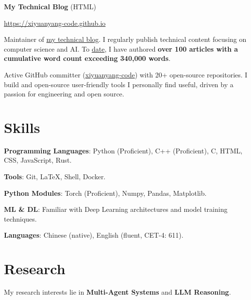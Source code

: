\documentclass[letterpaper,11pt]{article}
\begin{document}
\textbf{My Technical Blog} (HTML)

\url{https://xiyuanyang-code.github.io} 

Maintainer of \href{https://xiyuanyang-code.github.io}{my technical blog}. I regularly publish technical content focusing on computer science and AI. To \href{https://xiyuanyang-code.github.io/Blog-word-counting/}{date}, I have authored \textbf{over 100 articles with a cumulative word count exceeding 340,000 words}.
\newline

Active GitHub committer (\href{https://github.com/xiyuanyang-code}{xiyuanyang-code}) with 20+ open-source repositories. I build and open-source user-friendly tools I personally find useful, driven by a passion for engineering and open source.

\section{Skills}
\textbf{Programming Languages}: Python (Proficient), C++ (Proficient), C, HTML, CSS, JavaScript, Rust.

\textbf{Tools}: Git, LaTeX, Shell, Docker.

\textbf{Python Modules}: Torch (Proficient), Numpy, Pandas, Matplotlib.

\textbf{ML \& DL}: Familiar with Deep Learning architectures and model training techniques.

\textbf{Languages}: Chinese (native), English (fluent, CET-4: 611).


\section{Research}

My research interests lie in \textbf{Multi-Agent Systems} and \textbf{LLM Reasoning}. 




\end{document}
